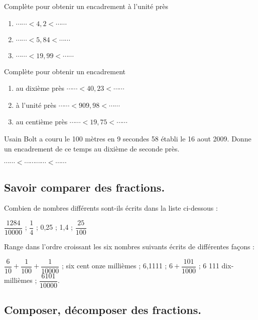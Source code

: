
Complète pour obtenir un encadrement à l'unité près 

\begin{enumerate}
 \item $\cdots\cdots < 4,2 < \cdots\cdots$ 
 \item $\cdots\cdots < 5,84 <\cdots\cdots$ 
 \item $\cdots\cdots < 19,99 <\cdots\cdots$ 
\end{enumerate}


Complète pour obtenir un encadrement  

\begin{enumerate}
 \item au dixième près $\cdots\cdots < 40,23 <\cdots\cdots$ 
 \item à l'unité près $\cdots\cdots < 909,98 <\cdots\cdots$ 
 \item au centième près $\cdots\cdots < 19,75 <\cdots\cdots$ 
\end{enumerate}



Usain Bolt a couru le 100 mètres en 9 secondes 58 établi le 16 aout 2009. Donne un encadrement de ce temps au dixième de seconde près.

$\cdots\cdots < \cdots\cdots\cdots\cdots < \cdots\cdots$ 


\subsection{Savoir comparer des fractions.}


Combien de nombres différents sont-ils écrits dans la liste ci-dessous : 

$\dfrac{1284}{10000}$ ; $\dfrac{1}{4}$ ; 0,25 ; 1,4 ; $\dfrac{25}{100}$




Range dans l'ordre croissant les six nombres suivants écrits de différentes façons :

$\dfrac{6}{10} + \dfrac{1}{100}+ \dfrac{1}{10000} $ ; six cent onze millièmes ; 6,1111 ; $6 +\dfrac{101}{1000}$
; 6 111 dix-millièmes ; $\dfrac{6 101}{10000}$.


\subsection{Composer, décomposer des fractions.}





